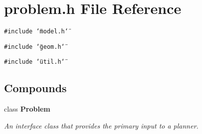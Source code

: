 \section{problem.h File Reference}
\label{problem_8h}
{\tt \#include \char`\"{}model.h\char`\"{}}\par
{\tt \#include \char`\"{}geom.h\char`\"{}}\par
{\tt \#include \char`\"{}util.h\char`\"{}}\par
\subsection*{Compounds}
\begin{CompactItemize}
\item 
class {\bf Problem}
\begin{CompactList}\small\item\em An interface class that provides the primary input to a planner.\item\end{CompactList}\end{CompactItemize}
